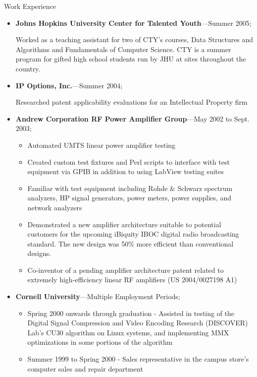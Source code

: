 \documentclass[10pt,oneside]{article}
\newenvironment{ressection}[1]{
	\vspace{4pt}
	{\Large#1}
	\begin{itemize}
	\vspace{3pt}
}{
	\end{itemize}
}
\newcommand{\ressubitem}[1]{
	\vspace{-1pt}
	\item \begin{flushleft} #1 \end{flushleft}
}
\newcommand{\resbigitem}[3]{
	\vspace{-5pt}
	\item
	\textbf{#1}---#2; \quad \textit{#3}
}
\newenvironment{ressubsec}[3]{
	\resbigitem{#1}{#2}{#3}
	\vspace{-2pt}
	\begin{itemize}
}{
	\end{itemize}
}
\newenvironment{ressection}[1]{
	\vspace{4pt}
	{\fontfamily{phv}\selectfont\Large#1}
	\begin{itemize}[leftmargin=12pt]
	\vspace{3pt}
}{
	\end{itemize}
}
\newcommand{\ressubitem}[1]{
	\vspace{-1pt}
	\item \begin{flushleft} #1 \end{flushleft}
}
\newcommand{\resbigitem}[2]{
	\vspace{-5pt}
	\item
	\textbf{#1}---\textit{#2}
}
\newenvironment{ressubsec}[2]{
	\resbigitem{#1}{#2}
	\vspace{-2pt}
	\begin{itemize}[leftmargin=12pt]
}{
	\end{itemize}
}
\begin{document}
\begin{ressection}{Work Experience}
	\begin{ressubsec}{Johns Hopkins University Center for Talented Youth}{Summer 2005}
		\ressubitem{Worked as a teaching assistant for two of CTY's courses, Data Structures and Algorithms and Fundamentals of Computer Science.  CTY is a summer program for gifted high school students run by JHU at sites throughout the country.}
	\end{ressubsec}

	\begin{ressubsec}{IP Options, Inc.}{Summer 2004}
		\ressubitem{Researched patent applicability evaluations for an Intellectual Property firm}
	\end{ressubsec}

	\begin{ressubsec}{Andrew Corporation RF Power Amplifier Group}{May 2002 to Sept. 2003}
		\ressubitem{Developed new amplifier architectures}
	        \ressubitem{Automated UMTS linear power amplifier testing}
		\ressubitem{Created custom test fixtures and Perl scripts to interface with test equipment via GPIB in addition to using LabView testing suites}
		\ressubitem{Familiar with test equipment including Rohde \& Schwarz spectrum analyzers, HP signal generators, power meters, power supplies, and network analyzers}
		\ressubitem{Demonstrated a new amplifier architecture suitable to potential customers for the upcoming iBiquity IBOC digital radio broadcasting standard. The new design was 50\% more efficient than conventional designs.}
		\ressubitem{Co-inventor of a pending amplifier architecture patent related to extremely high-efficiency linear RF amplifiers (US 2004/0027198 A1)}
	\end{ressubsec}

	\begin{ressubsec}{Cornell University}{Multiple Employment Periods}
	  \ressubitem{Summer 2001 - Assisted in the design of a digital receiver for Cornell University's CUPRI radar system using the Analog Devices AD6620 digital downconverter device and a National Instruments PCI-DIO-32HS digital I/O card}
	  \ressubitem{Spring 2000 onwards through graduation - Assisted in testing of the Digital Signal Compression and Video Encoding Research (DISCOVER) Lab's CU30 algorithm on Linux systems, and implementing MMX optimizations in some portions of the algorithm}
          \ressubitem{Summer 1999 to Spring 2000 - Sales representative in the campus store's computer sales and repair department}
	\end{ressubsec}


\end{ressection}
\end{document}
